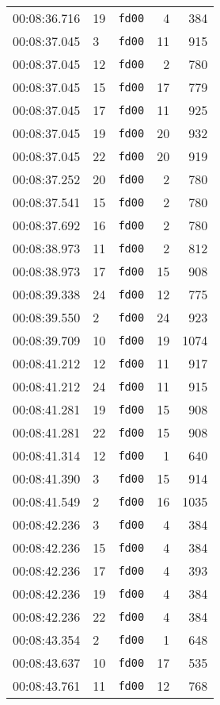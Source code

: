 \documentclass{article}
\begin{document}
\begin{longtable}{lllrr}
00:08:36.716 & 19 & \texttt{fd00} & 4 & 384 \\
00:08:37.045 & 3 & \texttt{fd00} & 11 & 915 \\
00:08:37.045 & 12 & \texttt{fd00} & 2 & 780 \\
00:08:37.045 & 15 & \texttt{fd00} & 17 & 779 \\
00:08:37.045 & 17 & \texttt{fd00} & 11 & 925 \\
00:08:37.045 & 19 & \texttt{fd00} & 20 & 932 \\
00:08:37.045 & 22 & \texttt{fd00} & 20 & 919 \\
00:08:37.252 & 20 & \texttt{fd00} & 2 & 780 \\
00:08:37.541 & 15 & \texttt{fd00} & 2 & 780 \\
00:08:37.692 & 16 & \texttt{fd00} & 2 & 780 \\
00:08:38.973 & 11 & \texttt{fd00} & 2 & 812 \\
00:08:38.973 & 17 & \texttt{fd00} & 15 & 908 \\
00:08:39.338 & 24 & \texttt{fd00} & 12 & 775 \\
00:08:39.550 & 2 & \texttt{fd00} & 24 & 923 \\
00:08:39.709 & 10 & \texttt{fd00} & 19 & 1074 \\
00:08:41.212 & 12 & \texttt{fd00} & 11 & 917 \\
00:08:41.212 & 24 & \texttt{fd00} & 11 & 915 \\
00:08:41.281 & 19 & \texttt{fd00} & 15 & 908 \\
00:08:41.281 & 22 & \texttt{fd00} & 15 & 908 \\
00:08:41.314 & 12 & \texttt{fd00} & 1 & 640 \\
00:08:41.390 & 3 & \texttt{fd00} & 15 & 914 \\
00:08:41.549 & 2 & \texttt{fd00} & 16 & 1035 \\
00:08:42.236 & 3 & \texttt{fd00} & 4 & 384 \\
00:08:42.236 & 15 & \texttt{fd00} & 4 & 384 \\
00:08:42.236 & 17 & \texttt{fd00} & 4 & 393 \\
00:08:42.236 & 19 & \texttt{fd00} & 4 & 384 \\
00:08:42.236 & 22 & \texttt{fd00} & 4 & 384 \\
00:08:43.354 & 2 & \texttt{fd00} & 1 & 648 \\
00:08:43.637 & 10 & \texttt{fd00} & 17 & 535 \\
00:08:43.761 & 11 & \texttt{fd00} & 12 & 768 \\

\end{longtable}
\end{document}
